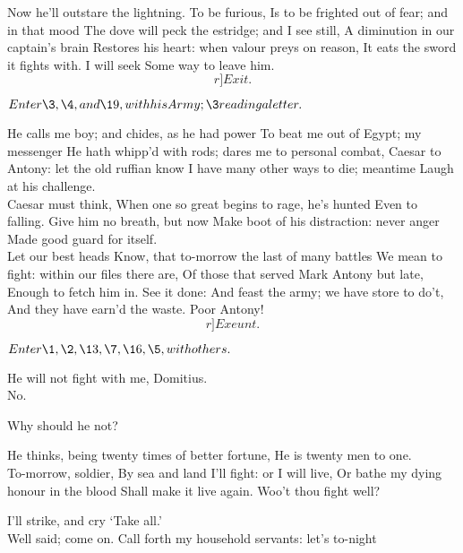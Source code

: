 \documentclass{book}
\begin{document}
	Now he'll outstare the lightning. To be furious,
	Is to be frighted out of fear; and in that mood
	The dove will peck the estridge; and I see still,
	A diminution in our captain's brain
	Restores his heart: when valour preys on reason,
	It eats the sword it fights with. I will seek
	Some way to leave him. 	\[r]Exit.\]




\Act




	\(Enter \3, \4, and \19, with his Army; \3 reading a letter.\)

\3	He calls me boy; and chides, as he had power
	To beat me out of Egypt; my messenger
	He hath whipp'd with rods; dares me to personal combat,
	Caesar to Antony: let the old ruffian know
	I have many other ways to die; meantime
	Laugh at his challenge. \\

	Caesar must think,
	When one so great begins to rage, he's hunted
	Even to falling. Give him no breath, but now
	Make boot of his distraction: never anger
	Made good guard for itself. \\

\3	Let our best heads
	Know, that to-morrow the last of many battles
	We mean to fight: within our files there are,
	Of those that served Mark Antony but late,
	Enough to fetch him in. See it done:
	And feast the army; we have store to do't,
	And they have earn'd the waste. Poor Antony! \[r]Exeunt.\]




	\(Enter \1, \2, \13, \7, \16,\\ \5, with others.\)

\1	He will not fight with me, Domitius. \\

	No.

\1	Why should he not?

	He thinks, being twenty times of better fortune,
	He is twenty men to one. \\

\1	To-morrow, soldier,
	By sea and land I'll fight: or I will live,
	Or bathe my dying honour in the blood
	Shall make it live again. Woo't thou fight well?

	I'll strike, and cry `Take all.' \\

\1	Well said; come on.
	Call forth my household servants: let's to-night
\end{document}
